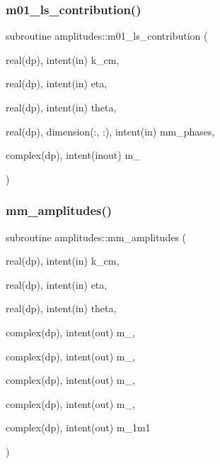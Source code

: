 \mbox{\label{namespaceamplitudes_ac2fb8ddf880b4a5d9dd1d941ee9a9713}} 
\subsubsection{\texorpdfstring{m01\+\_\+ls\+\_\+contribution()}{m01\_ls\_contribution()}}
{\footnotesize\ttfamily subroutine amplitudes\+::m01\+\_\+ls\+\_\+contribution (\begin{DoxyParamCaption}\item[{real(dp), intent(in)}]{k\+\_\+cm,  }\item[{real(dp), intent(in)}]{eta,  }\item[{real(dp), intent(in)}]{theta,  }\item[{real(dp), dimension(\+:, \+:), intent(in)}]{mm\+\_\+phases,  }\item[{complex(dp), intent(inout)}]{m\+\_ }\end{DoxyParamCaption})\hspace{0.3cm}{\ttfamily [private]}}

\mbox{\label{namespaceamplitudes_a4c67568b324f005039a7a4a10fbfad32}} 
\subsubsection{\texorpdfstring{mm\+\_\+amplitudes()}{mm\_amplitudes()}}
{\footnotesize\ttfamily subroutine amplitudes\+::mm\+\_\+amplitudes (\begin{DoxyParamCaption}\item[{real(dp), intent(in)}]{k\+\_\+cm,  }\item[{real(dp), intent(in)}]{eta,  }\item[{real(dp), intent(in)}]{theta,  }\item[{complex(dp), intent(out)}]{m\+\_,  }\item[{complex(dp), intent(out)}]{m\+\_,  }\item[{complex(dp), intent(out)}]{m\+\_,  }\item[{complex(dp), intent(out)}]{m\+\_,  }\item[{complex(dp), intent(out)}]{m\+\_\+1m1 }\end{DoxyParamCaption})\hspace{0.3cm}{\ttfamily [private]}}

